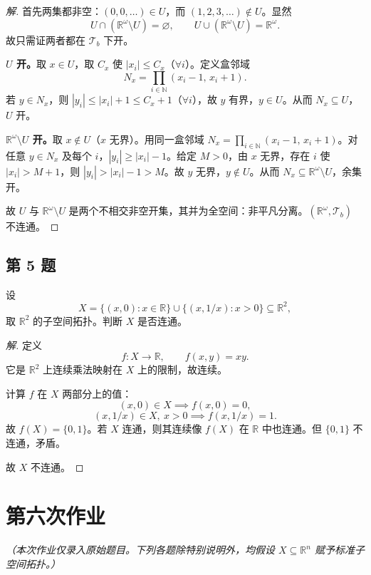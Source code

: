 \documentclass[11pt,a4paper]{article}
\newcommand{\R}{\mathbb{R}}
\newcommand{\N}{\mathbb{N}}
\theoremstyle{definition}
\newenvironment{solution}{\begin{proof}[解]}{\end{proof}}
\begin{document}
\begin{solution}
首先两集都非空：$(0,0,\dots) \in U$，而 $(1,2,3,\dots) \notin U$。显然
\[
  U \cap (\R^\omega \setminus U) = \varnothing, \qquad U \cup (\R^\omega \setminus U) = \R^\omega.
\]
故只需证两者都在 $\mathcal{T}_b$ 下开。

\textbf{$U$ 开。}取 $x \in U$，取 $C_x$ 使 $|x_i| \le C_x$（$\forall i$）。定义盒邻域
\[
  N_x = \prod_{i \in \N} (x_i - 1,\, x_i + 1).
\]
若 $y \in N_x$，则 $|y_i| \le |x_i| + 1 \le C_x + 1$（$\forall i$），故 $y$ 有界，$y \in U$。从而 $N_x \subseteq U$，$U$ 开。

\textbf{$\R^\omega \setminus U$ 开。}取 $x \notin U$（$x$ 无界）。用同一盒邻域 $N_x = \prod_{i \in \N} (x_i - 1,\, x_i + 1)$。对任意 $y \in N_x$ 及每个 $i$，$|y_i| \ge |x_i| - 1$。给定 $M > 0$，由 $x$ 无界，存在 $i$ 使 $|x_i| > M+1$，则 $|y_i| > |x_i| - 1 > M$。故 $y$ 无界，$y \notin U$。从而 $N_x \subseteq \R^\omega \setminus U$，余集开。

故 $U$ 与 $\R^\omega \setminus U$ 是两个不相交非空开集，其并为全空间：非平凡分离。$(\R^\omega, \mathcal{T}_b)$ 不连通。
\end{solution}

\subsection{第 5 题}

设
\[
  X = \{(x,0) : x \in \R\} \cup \{(x,1/x) : x > 0\} \subseteq \R^2,
\]
取 $\R^2$ 的子空间拓扑。判断 $X$ 是否连通。

\begin{solution}
定义
\[
  f : X \to \R, \qquad f(x,y) = xy.
\]
它是 $\R^2$ 上连续乘法映射在 $X$ 上的限制，故连续。

计算 $f$ 在 $X$ 两部分上的值：
\[
  (x,0) \in X \implies f(x,0) = 0,
\]
\[
  (x,1/x) \in X,\ x > 0 \implies f(x,1/x) = 1.
\]
故 $f(X) = \{0,1\}$。若 $X$ 连通，则其连续像 $f(X)$ 在 $\R$ 中也连通。但 $\{0,1\}$ 不连通，矛盾。

故 $X$ 不连通。
\end{solution}

\section{第六次作业}

\textit{（本次作业仅录入原始题目。下列各题除特别说明外，均假设 $X \subseteq \R^n$ 赋予标准子空间拓扑。）}
\end{document}
